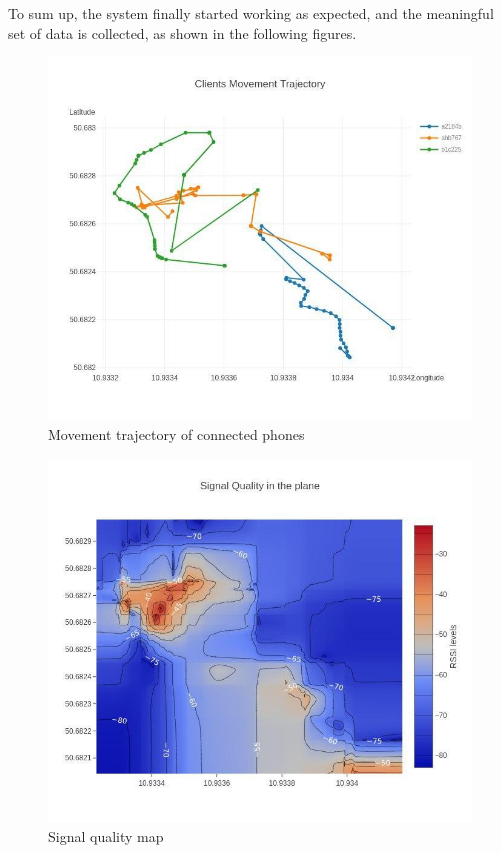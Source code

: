 To sum up, the system finally started working as expected, and the meaningful set of data is collected, as shown in the following figures.

\begin{figure}[H]
	\centering
	\includegraphics[width=\linewidth,keepaspectratio]{images/experiment_3_1.jpg}
\caption{Movement trajectory of connected phones}
\end{figure}

\begin{figure}[H]
	\centering
	\includegraphics[width=\linewidth,keepaspectratio]{images/experiment_3_2.jpg}
\caption{Signal quality map}
\end{figure}

